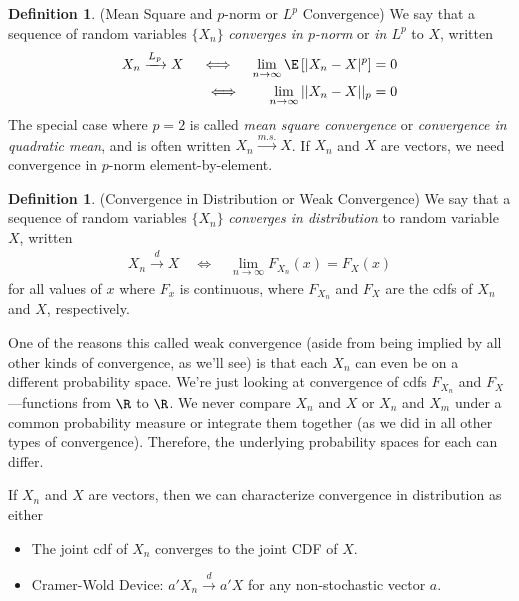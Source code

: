 \documentclass[12pt]{article}
\theoremstyle{plain}
\theoremstyle{definition}
\newtheorem{defn}[thm]{Definition}
\theoremstyle{remark}
\newcommand{\msto}{\xrightarrow{m.s.}}
\newcommand{\dto}{\xrightarrow{d}}
\newcommand{\Lpto}{\xrightarrow{L_p}}
\newcommand{\limn}{\lim_{n\rightarrow\infty}}
\begin{document}
\begin{defn}{(Mean Square and $p$-norm or $L^p$ Convergence)}
We say that a sequence of random variables $\{ X_n \}$
\emph{converges in $p$-norm} or \emph{in $L^p$} to $X$, written
\begin{align*}
  X_n \Lpto X
  \quad\iff\quad
  \limn \E\left[|X_n-X|^p\right] &= 0 \\
  \iff\quad\;\;\;
  \limn ||X_n-X||_p &= 0
\end{align*}
The special case where $p=2$ is called \emph{mean square convergence} or
\emph{convergence in quadratic mean}, and is often written $X_n\msto X$.
If $X_n$ and $X$ are vectors, we need convergence in $p$-norm
element-by-element.
\end{defn}


\begin{defn}{(Convergence in Distribution or Weak Convergence)}
\label{defn:convergeInDistribution}
We say that a sequence of random variables $\{X_n\}$
\emph{converges in distribution} to random variable $X$, written
\begin{align*}
  X_n\dto X
  \quad\iff\quad
  \limn F_{X_n}(x) = F_X(x)
\end{align*}
for all values of $x$ where $F_x$ is continuous,
where $F_{X_n}$ and $F_X$ are the cdfs of $X_n$ and $X$, respectively.

One of the reasons this called weak convergence (aside from being
implied by all other kinds of convergence, as we'll see) is that each
$X_n$ can even be on a different probability space. We're just looking
at convergence of cdfs $F_{X_n}$ and $F_X$---functions from $\R$ to
$\R$.  We never compare $X_n$ and $X$ or $X_n$ and $X_m$ under a common
probability measure or integrate them together (as we did in all other
types of convergence). Therefore, the underlying probability spaces for
each can differ.

If $X_n$ and $X$ are vectors, then we can characterize convergence
in distribution as either
\begin{itemize}
  \item The joint cdf of $X_n$ converges to the joint CDF of $X$.
  \item Cramer-Wold Device: $a'X_n \dto a'X$ for any non-stochastic
    vector $a$.
\end{itemize}
\end{defn}
\end{document}
